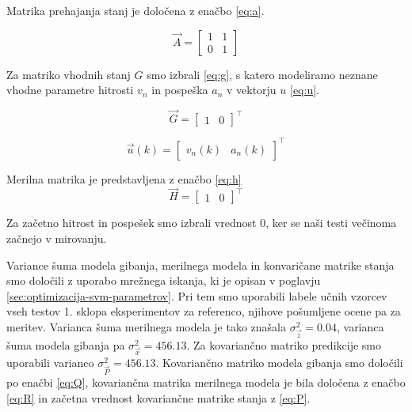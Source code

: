 Matrika prehajanja stanj je določena z enačbo \eqref{eq:a}.

\begin{equation}
\vec{A} = \begin{bmatrix}
				1 & 1 \\
                0 & 1
			\end{bmatrix} 
            \label{eq:a}
\end{equation}

Za matriko vhodnih stanj $G$ smo izbrali \eqref{eq:g}, s katero modeliramo neznane vhodne parametre hitrosti $v_n$ in pospeška $a_n$ v vektorju $u$ \eqref{eq:u}. 

\begin{equation}
\vec{G} = \begin{bmatrix}
				1 & 0
			\end{bmatrix}^\top 
            \label{eq:g}
\end{equation}

\begin{equation}
\vec{u}(k) = \begin{bmatrix}
					v_{n}(k) & a_n(k)
				\end{bmatrix}^\top 
                \label{eq:u}
\end{equation}


Merilna matrika je predstavljena z enačbo \eqref{eq:h}
\begin{equation}
\vec{H} = \begin{bmatrix}
				1 & 0
			\end{bmatrix}^\top 
            \label{eq:h}
\end{equation}

Za začetno hitrost in pospešek smo izbrali vrednost $0$, ker se naši testi večinoma začnejo v mirovanju. 

Variance šuma modela gibanja, merilnega modela in konvaričane matrike stanja smo določili z uporabo mrežnega iskanja, ki je opisan v poglavju \ref{sec:optimizacija-svm-parametrov}. Pri tem smo uporabili labele učnih vzorcev vseh testov 1. sklopa eksperimentov za referenco, njihove pošumljene ocene pa za meritev. Varianca šuma merilnega modela je tako znašala $\sigma_\vec{z}^2 = 0.04$, varianca šuma modela gibanja pa $\sigma_\vec{x}^2 = 456.13$. Za kovariančno matriko predikcije smo uporabili varianco $\sigma_\vec{P}^2 = 456.13$. Kovariančno matriko modela gibanja smo določili po enačbi \eqref{eq:Q}, kovariančna matrika merilnega modela je bila določena z enačbo \eqref{eq:R} in začetna vrednost kovariančne matrike stanja z \eqref{eq:P}.

